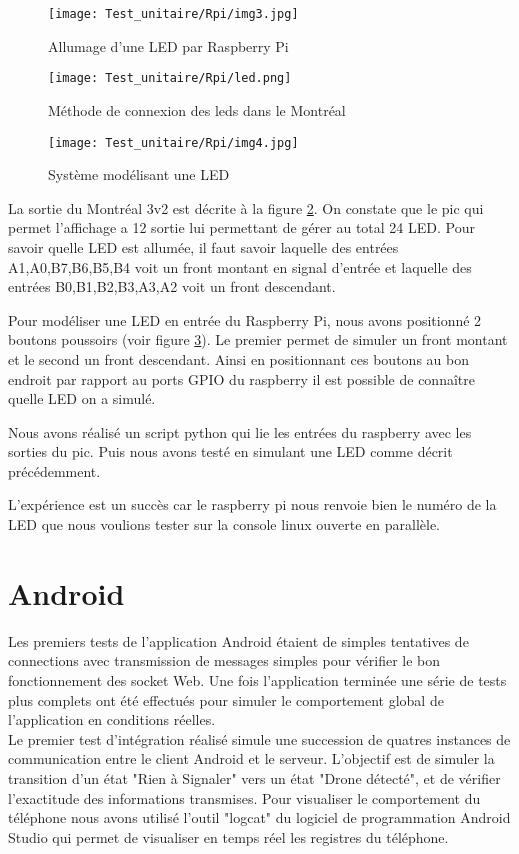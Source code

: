 \begin{figure}[!h]
  \texttt{[image: Test\_unitaire/Rpi/img3.jpg]}
  \caption{Allumage d'une LED par Raspberry Pi}
  \label{figure:led}
\end{figure}

\begin{figure}[!h]
  \centering
  \texttt{[image: Test\_unitaire/Rpi/led.png]}
  \caption{Méthode de connexion des leds dans le Montréal}  
  \label{figure:ledMontreal}
\end{figure}
\begin{figure}[!h]
  \centering
  \texttt{[image: Test\_unitaire/Rpi/img4.jpg]}  
  \caption{Système modélisant une LED}
  \label{figure:test}
\end{figure}

La sortie du Montréal 3v2 est décrite à la figure \ref{figure:ledMontreal}. On constate que le pic qui permet l'affichage a 12 sortie lui permettant de gérer au total 24 LED. Pour savoir quelle LED est allumée, il faut savoir laquelle des entrées A1,A0,B7,B6,B5,B4 voit un front montant en signal d'entrée et laquelle des entrées B0,B1,B2,B3,A3,A2 voit un front descendant.

Pour modéliser une LED en entrée du Raspberry Pi, nous avons positionné 2 boutons poussoirs (voir figure \ref{figure:test}). Le premier permet de simuler un front montant et le second un front descendant. Ainsi en positionnant ces boutons au bon endroit par rapport au ports GPIO du raspberry il est possible de connaître quelle LED on a simulé.

Nous avons réalisé un script python qui lie les entrées du raspberry avec les sorties du pic. Puis nous avons testé en simulant une LED comme décrit précédemment.

L'expérience est un succès car le raspberry pi nous renvoie bien le numéro de la LED que nous voulions tester sur la console linux ouverte en parallèle.


\section{Android}

Les premiers tests de l'application Android étaient de simples tentatives de connections avec transmission de messages simples pour vérifier le bon fonctionnement des socket Web. 
Une fois l'application terminée une série de tests plus complets ont été effectués pour simuler le comportement global de l'application en conditions réelles.
~\\
Le premier test d'intégration réalisé simule une succession de quatres instances de communication entre le client Android et le serveur. L'objectif est de simuler la transition d'un état "Rien à Signaler" vers un état "Drone détecté", et de vérifier l'exactitude des informations transmises. Pour visualiser le comportement du téléphone nous avons utilisé l'outil "logcat" du logiciel de programmation Android Studio qui permet de visualiser en temps réel les registres du téléphone. 

